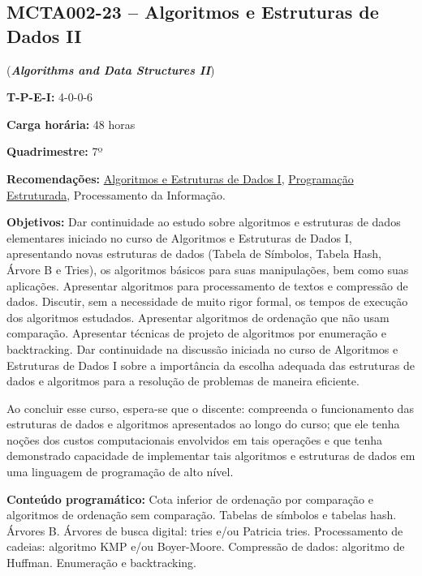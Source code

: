 \documentclass[class=article, crop=false]{standalone}
\begin{document}
\subsection{MCTA002-23 -- Algoritmos e Estruturas de Dados II}
\label{disc:aedII}

(\textbf{\textit{Algorithms and Data Structures II}})

\begin{center}
    \begin{minipage}{0.85\textwidth}
        \textbf{T-P-E-I:} 4-0-0-6
        
        \textbf{Carga horária:} 48 horas
        
        \textbf{Quadrimestre:} 7º
        
        \textbf{Recomendações:} 
        \hyperref[disc:aedI]{Algoritmos e Estruturas de Dados I},
        \hyperref[disc:pe]{Programação Estruturada},
        Processamento da Informação.
    \end{minipage}
\end{center}

\textbf{Objetivos:}
Dar continuidade ao estudo sobre algoritmos e estruturas de dados elementares
iniciado no curso de Algoritmos e Estruturas de Dados I, apresentando novas 
estruturas de dados (Tabela de Símbolos, Tabela Hash, Árvore B e Tries), os 
algoritmos básicos para suas manipulações, bem como suas aplicações. 
Apresentar algoritmos para processamento de textos e compressão de dados. 
Discutir, sem a necessidade de muito rigor formal, os tempos de execução dos 
algoritmos estudados.
Apresentar algoritmos de ordenação que não usam comparação.
Apresentar técnicas de projeto de algoritmos por enumeração e backtracking.
Dar continuidade na discussão iniciada no curso de Algoritmos e Estruturas 
de Dados I sobre a importância da escolha adequada das estruturas de dados e
algoritmos para a resolução de problemas de maneira eficiente.

Ao concluir esse curso, espera-se que o discente: compreenda o funcionamento
das estruturas de dados e algoritmos apresentados ao longo do curso; que ele
tenha noções dos custos computacionais envolvidos em tais operações e que tenha
demonstrado capacidade de implementar tais algoritmos e estruturas de dados em
uma linguagem de programação de alto nível.

\textbf{Conteúdo programático:}
Cota inferior de ordenação por comparação e algoritmos de ordenação sem comparação.
Tabelas de símbolos e tabelas hash.
Árvores B.
Árvores de busca digital: tries e/ou Patricia tries.
Processamento de cadeias: algoritmo KMP e/ou Boyer-Moore.
Compressão de dados: algoritmo de Huffman.
Enumeração e backtracking.
\end{document}
